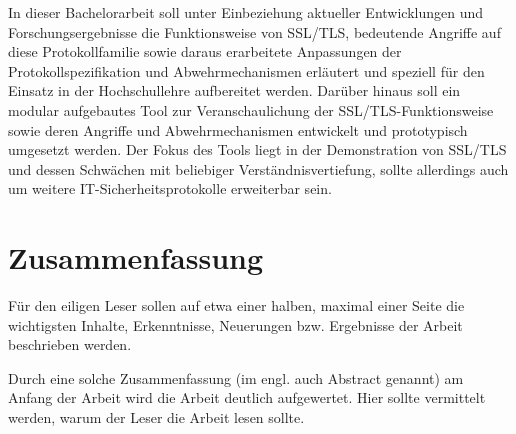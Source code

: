\documentclass[
    12pt,
    headings=small,
    parskip=half,           %
    bibliography=totoc,
    numbers=noenddot,       %
    open=any,               %
   final                   %
    ]{scrreprt}
\begin{document}
In dieser Bachelorarbeit soll unter Einbeziehung aktueller Entwicklungen und Forschungsergebnisse die Funktionsweise von SSL/TLS, bedeutende Angriffe auf diese Protokollfamilie sowie daraus erarbeitete Anpassungen der Protokollspezifikation und Abwehrmechanismen erläutert und speziell für den Einsatz in der Hochschullehre aufbereitet werden. Darüber hinaus soll ein modular aufgebautes Tool zur Veranschaulichung der SSL/TLS-Funktionsweise sowie deren Angriffe und Abwehrmechanismen entwickelt und prototypisch umgesetzt werden. Der Fokus des Tools liegt in der Demonstration von SSL/TLS und dessen Schwächen mit beliebiger Verständnisvertiefung, sollte allerdings auch um weitere IT-Sicherheitsprotokolle erweiterbar sein.

\chapter*{Zusammenfassung}


Für den eiligen Leser sollen auf etwa einer halben, maximal einer Seite die wichtigsten Inhalte, Erkenntnisse, Neuerungen bzw. Ergebnisse der Arbeit beschrieben werden.

Durch eine solche Zusammenfassung (im engl. auch Abstract genannt) am Anfang der Arbeit wird die Arbeit deutlich aufgewertet. Hier sollte vermittelt werden, warum der Leser die Arbeit lesen sollte.

\tableofcontents


















\listoftodos
\end{document}
